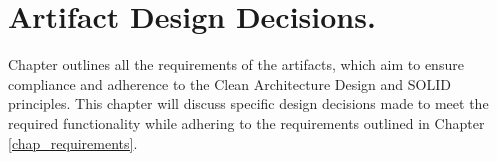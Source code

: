 \chapter{Artifact Design Decisions.} \label{chap_designing_artifacts}

Chapter  outlines all the requirements of the artifacts, which
aim to ensure compliance and adherence to the Clean Architecture Design and SOLID
principles. This chapter will discuss specific design decisions made to meet the required
functionality while adhering to the requirements outlined in Chapter
\ref{chap_requirements}.





